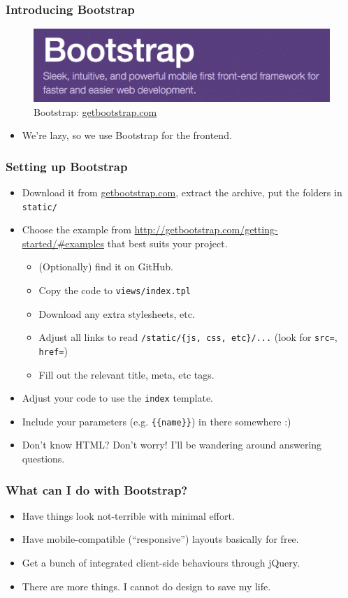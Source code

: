 \documentclass{beamer}
\begin{document}
\begin{frame}
  \frametitle{Introducing Bootstrap}
  \begin{figure}[h!]
    \centering
    \includegraphics[scale=0.3]{imgs/bootstrap_banner.png}
    \caption{Bootstrap: \url{getbootstrap.com}}
    \label{fig:bootstrap_banner}
  \end{figure}

  \begin{itemize}
  \item We're lazy, so we use Bootstrap for the frontend.
\end{itemize}
\end{frame}

\begin{frame}[fragile]
\frametitle{Setting up Bootstrap}
\begin{itemize}
  \item Download it from \url{getbootstrap.com}, extract the archive,
    put the folders in \texttt{static/}
  \item Choose the example from
    \url{http://getbootstrap.com/getting-started/#examples} that best
    suits your project.
    \begin{itemize}
      \item (Optionally) find it on GitHub.
      \item Copy the code to \texttt{views/index.tpl}
      \item Download any extra stylesheets, etc.
      \item Adjust all links to read \texttt{/static/\{js, css,
        etc\}/...} (look for \texttt{src=}, \texttt{href=})
      \item Fill out the relevant title, meta, etc tags.
    \end{itemize}
  \item Adjust your code to use the \texttt{index} template.
  \item Include your parameters (e.g. \texttt{\{\{name\}\}}) in there
    somewhere :)
  \item Don't know HTML? Don't worry! I'll be wandering around
    answering questions.
  \end{itemize}
\end{frame}

\begin{frame}
  \frametitle{What can I do with Bootstrap?}
  \begin{itemize}
  \item Have things look not-terrible with minimal effort.
  \item Have mobile-compatible (``responsive'') layouts basically for
    free.
  \item Get a bunch of integrated client-side behaviours through
    jQuery.
  \item There are more things. I cannot do design to save my life.
  \end{itemize}
\end{frame}
\end{document}
